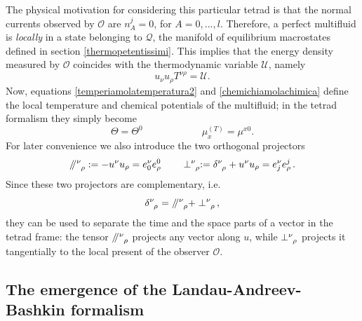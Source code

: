 \documentclass[usenatbib]{mnras}
\newcommand{\spc}{\quad \quad \quad}
\newcommand{\paral}{\, \mathbin{\!/\mkern-5mu/\!} \, }
\begin{document}
The physical motivation for considering this particular tetrad is that the normal currents observed by $\mathcal{O}$ are $n_A^j=0$, for $A=0,...,l$. Therefore, a perfect multifluid is \emph{locally} in a state belonging to $\mathcal{Q}$, the manifold of equilibrium macrostates defined in section \ref{thermopetentissimi}. This implies that the energy density measured by $\mathcal{O}$ coincides with the thermodynamic variable $\mathcal{U}$, namely
%
\begin{equation}\label{interiormente}
u_\nu u_\rho T^{\nu \rho} = \mathcal{U} .
\end{equation}
%
Now, equations \eqref{temperiamolatemperatura2} and \eqref{chemichiamolachimica} define the local temperature and chemical potentials of the multifluid; in the tetrad formalism they simply become
%
\begin{equation}
\Theta = \Theta^0 \spc \spc \mu_x^{(T)} = \mu^{x0}.
\end{equation}
%
For later convenience we also introduce the two orthogonal projectors
%
\begin{equation}
\label{proettoriferoci1}
\paral\indices{^\nu _\rho}:= - u^\nu u_\rho = e^\nu_0 e^0_\rho
\qquad
\perp\indices{^\nu _\rho}:= \delta\indices{^\nu_\rho} + u^\nu u_\rho =  e^\nu_j e^j_\rho\, . 
\end{equation} 
%
Since these two projectors are complementary, i.e.
%
\begin{equation}\label{resolutionofidentity}
\delta\indices{^\nu _\rho} = \paral\indices{^\nu _\rho} + \perp\indices{^\nu _\rho}  \, ,
\end{equation}
%
they can be used to separate the time and the space parts of a vector in the tetrad frame: the tensor $\paral\indices{^\nu _\rho}$ projects any vector along $u$, while $\perp\indices{^\nu _\rho}$ projects it 
tangentially to the local present of the observer $\mathcal{O}$. 


\subsection{The emergence of the Landau-Andreev-Bashkin formalism}
\label{bsgformalism}
\end{document}
